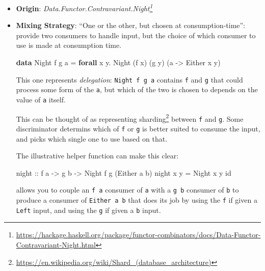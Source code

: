 \documentclass[]{article}
\newenvironment{Shaded}{}{}
\newcommand{\DataTypeTok}[1]{\textcolor[rgb]{0.56,0.13,0.00}{#1}}
\newcommand{\FunctionTok}[1]{\textcolor[rgb]{0.02,0.16,0.49}{#1}}
\newcommand{\KeywordTok}[1]{\textcolor[rgb]{0.00,0.44,0.13}{\textbf{#1}}}
\newcommand{\NormalTok}[1]{#1}
\newcommand{\OperatorTok}[1]{\textcolor[rgb]{0.40,0.40,0.40}{#1}}
\newcommand{\OtherTok}[1]{\textcolor[rgb]{0.00,0.44,0.13}{#1}}
\renewcommand{\href}[2]{#2\footnote{\url{#1}}}
\begin{document}
\begin{itemize}
\item
  \textbf{Origin}:
  \emph{\href{https://hackage.haskell.org/package/functor-combinators/docs/Data-Functor-Contravariant-Night.html}{Data.Functor.Contravariant.Night}}
\item
  \textbf{Mixing Strategy}: ``One or the other, but chosen at
  consumption-time'': provide two consumers to handle input, but the choice of
  which consumer to use is made at consumption time.

\begin{Shaded}
\begin{Highlighting}[]
\KeywordTok{data} \DataTypeTok{Night}\NormalTok{ f g a }\OtherTok{=} \KeywordTok{forall}\NormalTok{ x y}\OperatorTok{.} \DataTypeTok{Night}\NormalTok{ (f x) (g y) (a }\OtherTok{{-}>} \DataTypeTok{Either}\NormalTok{ x y)}
\end{Highlighting}
\end{Shaded}

  This one represents \emph{delegation}: \texttt{Night\ f\ g\ a} contains
  \texttt{f} and \texttt{g} that could process some form of the \texttt{a}, but
  which of the two is chosen to depends on the value of \texttt{a} itself.

  This can be thought of as representing
  \href{https://en.wikipedia.org/wiki/Shard_(database_architecture)}{sharding}
  between \texttt{f} and \texttt{g}. Some discriminator determins which of
  \texttt{f} or \texttt{g} is better suited to consume the input, and picks
  which single one to use based on that.

  The illustrative helper function can make this clear:

\begin{Shaded}
\begin{Highlighting}[]
\OtherTok{night ::}\NormalTok{ f a }\OtherTok{{-}>}\NormalTok{ g b }\OtherTok{{-}>} \DataTypeTok{Night}\NormalTok{ f g (}\DataTypeTok{Either}\NormalTok{ a b)}
\NormalTok{night x y }\OtherTok{=} \DataTypeTok{Night}\NormalTok{ x y }\FunctionTok{id}
\end{Highlighting}
\end{Shaded}

  allows you to couple an \texttt{f\ a} consumer of \texttt{a} with a
  \texttt{g\ b} consumer of \texttt{b} to produce a consumer of
  \texttt{Either\ a\ b} that does its job by using the \texttt{f} if given a
  \texttt{Left} input, and using the \texttt{g} if given a \texttt{b} input.


\end{itemize}
\end{document}

